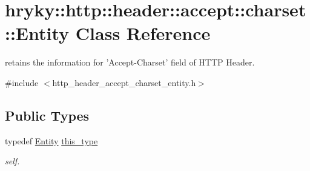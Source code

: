 \hypertarget{classhryky_1_1http_1_1header_1_1accept_1_1charset_1_1_entity}{\section{hryky\-:\-:http\-:\-:header\-:\-:accept\-:\-:charset\-:\-:Entity Class Reference}
\label{classhryky_1_1http_1_1header_1_1accept_1_1charset_1_1_entity}
}


retains the information for 'Accept-\/\-Charset' field of H\-T\-T\-P Header.  




{\ttfamily \#include $<$http\-\_\-header\-\_\-accept\-\_\-charset\-\_\-entity.\-h$>$}

\subsection*{Public Types}
\begin{DoxyCompactItemize}
\item 
\hypertarget{classhryky_1_1http_1_1header_1_1accept_1_1charset_1_1_entity_a168a404359258f6dde00516a5b90b074}{typedef \hyperlink{classhryky_1_1http_1_1header_1_1accept_1_1charset_1_1_entity}{Entity} \hyperlink{classhryky_1_1http_1_1header_1_1accept_1_1charset_1_1_entity_a168a404359258f6dde00516a5b90b074}{this\-\_\-type}}\label{classhryky_1_1http_1_1header_1_1accept_1_1charset_1_1_entity_a168a404359258f6dde00516a5b90b074}

\begin{DoxyCompactList}\small\item\em self. \end{DoxyCompactList}\end{DoxyCompactItemize}
